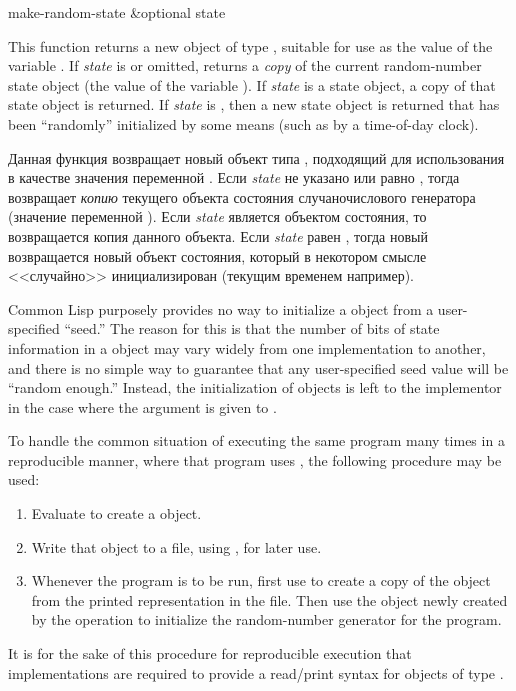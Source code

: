 \begin{defun}[Function]
make-random-state &optional state

This function returns a new object of type ,
suitable for use as the value of the variable .
If \emph{state} is {\false} or omitted,  returns a \emph{copy}
of the current random-number state object (the value of
the variable ).  If \emph{state} is a state object,
a copy of that state object is returned.  If \emph{state} is {\true},
then a new state object is returned that has been ``randomly''
initialized by some means (such as by a time-of-day clock).

Данная функция возвращает новый объект типа , подходящий для
использования в качестве значения переменной .
Если \emph{state} не указано или равно {\false}, тогда 
возвращает \emph{копию} текущего объекта состояния случаночислового генератора
(значение переменной ). Если \emph{state} является объектом
состояния, то возвращается копия данного объекта.
Если \emph{state} равен {\true}, тогда новый возвращается новый объект
состояния, который в некотором смысле <<случайно>> инициализирован (текущим
временем например).

\beforenoterule
\begin{rationale}
Common Lisp purposely provides no way to initialize a 
object from a user-specified ``seed.''  The reason for this is that
the number of bits of state information in a  object
may vary widely from one implementation to another, and there is no
simple way to guarantee that any user-specified seed value will be
``random enough.''  Instead, the initialization of 
objects is left to the implementor in the case where the argument {\true}
is given to .

To handle the common situation of executing the same program many times
in a reproducible manner, where that program uses , the following
procedure may be used:
\begin{enumerate}
\item
Evaluate  to create a  object.

\item
Write that object to a file, using , for later use.

\item
Whenever the program is to be run, first use  to create
a copy of the  object from the printed representation
in the file.
Then use the  object newly created by the  operation
to initialize the random-number generator for the program.
\end{enumerate}
It is for the sake of this procedure for reproducible execution that
implementations are required to provide a read/print syntax for objects
of type .


\end{rationale}
\end{defun}
